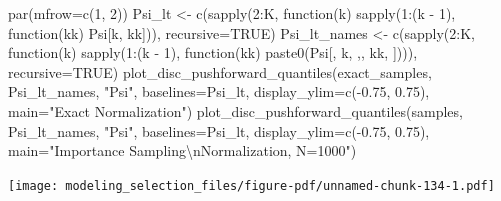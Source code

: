 \documentclass[
  letterpaper,
  DIV=11,
  numbers=noendperiod]{scrartcl}
\newenvironment{Shaded}{\begin{snugshade}}{\end{snugshade}}
\newcommand{\AttributeTok}[1]{\textcolor[rgb]{0.40,0.45,0.13}{#1}}
\newcommand{\ConstantTok}[1]{\textcolor[rgb]{0.56,0.35,0.01}{#1}}
\newcommand{\ControlFlowTok}[1]{\textcolor[rgb]{0.00,0.23,0.31}{#1}}
\newcommand{\DecValTok}[1]{\textcolor[rgb]{0.68,0.00,0.00}{#1}}
\newcommand{\FloatTok}[1]{\textcolor[rgb]{0.68,0.00,0.00}{#1}}
\newcommand{\FunctionTok}[1]{\textcolor[rgb]{0.28,0.35,0.67}{#1}}
\newcommand{\NormalTok}[1]{\textcolor[rgb]{0.00,0.23,0.31}{#1}}
\newcommand{\OtherTok}[1]{\textcolor[rgb]{0.00,0.23,0.31}{#1}}
\newcommand{\SpecialCharTok}[1]{\textcolor[rgb]{0.37,0.37,0.37}{#1}}
\newcommand{\StringTok}[1]{\textcolor[rgb]{0.13,0.47,0.30}{#1}}
\begin{document}
\begin{Shaded}
\begin{Highlighting}[]
\FunctionTok{par}\NormalTok{(}\AttributeTok{mfrow=}\FunctionTok{c}\NormalTok{(}\DecValTok{1}\NormalTok{, }\DecValTok{2}\NormalTok{))}
\NormalTok{Psi\_lt }\OtherTok{\textless{}{-}} \FunctionTok{c}\NormalTok{(}\FunctionTok{sapply}\NormalTok{(}\DecValTok{2}\SpecialCharTok{:}\NormalTok{K, }\ControlFlowTok{function}\NormalTok{(k)}
  \FunctionTok{sapply}\NormalTok{(}\DecValTok{1}\SpecialCharTok{:}\NormalTok{(k }\SpecialCharTok{{-}} \DecValTok{1}\NormalTok{), }\ControlFlowTok{function}\NormalTok{(kk) Psi[k, kk])),}
  \AttributeTok{recursive=}\ConstantTok{TRUE}\NormalTok{)}
\NormalTok{Psi\_lt\_names }\OtherTok{\textless{}{-}} \FunctionTok{c}\NormalTok{(}\FunctionTok{sapply}\NormalTok{(}\DecValTok{2}\SpecialCharTok{:}\NormalTok{K, }\ControlFlowTok{function}\NormalTok{(k)}
  \FunctionTok{sapply}\NormalTok{(}\DecValTok{1}\SpecialCharTok{:}\NormalTok{(k }\SpecialCharTok{{-}} \DecValTok{1}\NormalTok{), }\ControlFlowTok{function}\NormalTok{(kk)}
    \FunctionTok{paste0}\NormalTok{(}\StringTok{\textquotesingle{}Psi[\textquotesingle{}}\NormalTok{, k, }\StringTok{\textquotesingle{},\textquotesingle{}}\NormalTok{, kk, }\StringTok{\textquotesingle{}]\textquotesingle{}}\NormalTok{))),}
  \AttributeTok{recursive=}\ConstantTok{TRUE}\NormalTok{)}
\FunctionTok{plot\_disc\_pushforward\_quantiles}\NormalTok{(exact\_samples, Psi\_lt\_names, }\StringTok{"Psi"}\NormalTok{,}
                                \AttributeTok{baselines=}\NormalTok{Psi\_lt, }\AttributeTok{display\_ylim=}\FunctionTok{c}\NormalTok{(}\SpecialCharTok{{-}}\FloatTok{0.75}\NormalTok{, }\FloatTok{0.75}\NormalTok{),}
                                \AttributeTok{main=}\StringTok{"Exact Normalization"}\NormalTok{)}
\FunctionTok{plot\_disc\_pushforward\_quantiles}\NormalTok{(samples, Psi\_lt\_names, }\StringTok{"Psi"}\NormalTok{,}
                                \AttributeTok{baselines=}\NormalTok{Psi\_lt, }\AttributeTok{display\_ylim=}\FunctionTok{c}\NormalTok{(}\SpecialCharTok{{-}}\FloatTok{0.75}\NormalTok{, }\FloatTok{0.75}\NormalTok{),}
                                \AttributeTok{main=}\StringTok{"Importance Sampling}\SpecialCharTok{\textbackslash{}n}\StringTok{Normalization, N=1000"}\NormalTok{)}
\end{Highlighting}
\end{Shaded}

\texttt{[image: modeling\_selection\_files/figure-pdf/unnamed-chunk-134-1.pdf]}
\end{document}
